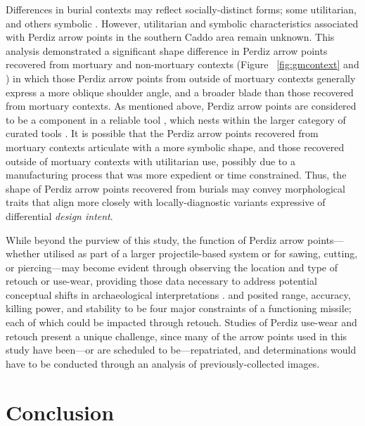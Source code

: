 \documentclass[review]{elsarticle}
\begin{document}
Differences in burial contexts may reflect socially-distinct forms; some utilitarian, and others symbolic \citep[69]{RN8989}. However, utilitarian and symbolic characteristics associated with Perdiz arrow points in the southern Caddo area remain unknown. This analysis demonstrated a significant shape difference in Perdiz arrow points recovered from mortuary and non-mortuary contexts (Figure ~\ref{fig:gmcontext} and \citealt{RN8980}) in which those Perdiz arrow points from outside of mortuary contexts generally express a more oblique shoulder angle, and a broader blade than those recovered from mortuary contexts. As mentioned above, Perdiz arrow points are considered to be a component in a reliable tool \citep{RN5873}, which nests within the larger category of curated tools \citep{RN5880}. It is possible that the Perdiz arrow points recovered from mortuary contexts articulate with a more symbolic shape, and those recovered outside of mortuary contexts with utilitarian use, possibly due to a manufacturing process that was more expedient or time constrained. Thus, the shape of Perdiz arrow points recovered from burials may convey morphological traits that align more closely with locally-diagnostic variants expressive of differential \textit{design intent}.

While beyond the purview of this study, the function of Perdiz arrow points---whether utilised as part of a larger projectile-based system or for sawing, cutting, or piercing---may become evident through observing the location and type of retouch or use-wear, providing those data necessary to address potential conceptual shifts in archaeological interpretations \citep{RN8990,RN8991,RN8992,RN6342}. \citet{RN8994} and \citet{RN8993} posited range, accuracy, killing power, and stability to be four major constraints of a functioning missile; each of which could be impacted through retouch. Studies of Perdiz use-wear and retouch present a unique challenge, since many of the arrow points used in this study have been---or are scheduled to be---repatriated, and determinations would have to be conducted through an analysis of previously-collected images.

\section*{Conclusion}
\end{document}
